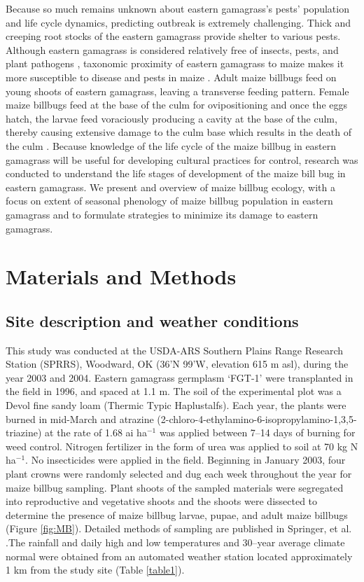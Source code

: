 \documentclass[agronomy,article,submit,moreauthors,pdftex,10pt,a4paper]{mdpi}
\theoremstyle{mdpi}
\newcounter{ex}
\newcounter{re}
\theoremstyle{mdpidefinition}
\begin{document}
Because so much remains unknown about eastern gamagrass’s pests’ population and life cycle dynamics, predicting outbreak is extremely challenging. Thick and creeping root stocks of the eastern gamagrass provide shelter to various pests. Although eastern gamagrass is considered relatively free of insects, pests, and plant pathogens \cite{krizek04}, taxonomic proximity of eastern gamagrass to maize makes it more susceptible to disease and pests in maize \cite{springer06,maas03}. Adult maize billbugs feed on young shoots of eastern gamagrass, leaving a transverse feeding pattern. Female maize billbugs feed at the base of the culm for ovipositioning and once the eggs hatch, the larvae feed voraciously producing a cavity at the base of the culm, thereby causing extensive damage to the culm base which results in the death of the culm \cite{springer03}. Because knowledge of the life cycle of the maize billbug in eastern gamagrass will be useful for developing cultural practices for control, research was conducted to understand the life stages of development of the maize bill bug in eastern gamagrass. We present and overview of maize billbug ecology, with a focus on extent of seasonal phenology of maize billbug population in eastern gamagrass and to formulate strategies to minimize its damage to eastern gamagrass.

\section{Materials and Methods}

\subsection{Site description and weather conditions}


This study was conducted at the USDA-ARS Southern Plains Range Research Station (SPRRS), Woodward, OK (36’N 99’W, elevation 615 m asl), during the year 2003 and 2004. Eastern gamagrass germplasm ‘FGT-1’ \cite{Dewald96} were transplanted in the field in 1996, and spaced at 1.1 m. The soil of the experimental plot was a Devol fine sandy loam (Thermic Typic Haplustalfs). Each year, the plants were burned in mid-March and atrazine (2-chloro-4-ethylamino-6-isopropylamino-1,3,5-triazine) at the rate of 1.68 ai ha$^{-1}$ was applied between 7–14 days of burning for weed control. Nitrogen fertilizer in the form of urea was applied to soil at 70 kg N ha$^{-1}$. No insecticides were applied in the field. Beginning in January 2003, four plant crowns were randomly selected and dug each week throughout the year for maize billbug sampling. Plant shoots of the sampled materials were segregated into reproductive and vegetative shoots and the shoots were dissected to determine the presence of maize billbug larvae, pupae, and adult maize billbugs (Figure \ref{fig:MB}). Detailed methods of sampling are published in Springer, et al. \cite{springer11}.The rainfall and daily high and low temperatures and 30–year average climate normal were obtained from an automated weather station located approximately 1 km from the study site (Table \ref{table1}). 
\end{document}
